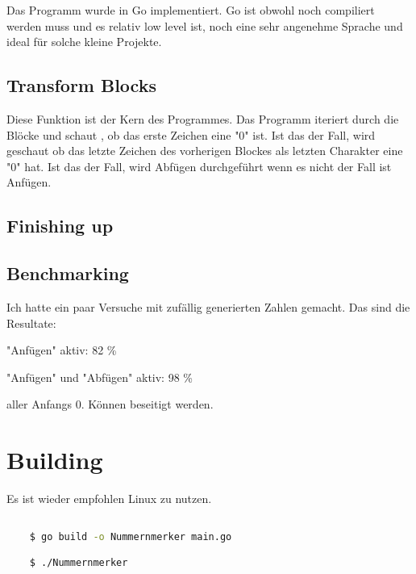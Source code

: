 \documentclass{article}
\begin{document}
Das Programm wurde in Go implementiert. Go ist obwohl noch compiliert werden muss und es relativ low level ist, noch eine sehr angenehme Sprache und ideal für solche kleine Projekte.

\subsection{Transform Blocks}

Diese Funktion ist der Kern des Programmes. Das Programm iteriert durch die Blöcke und schaut , ob das erste Zeichen eine "0" ist. Ist das der Fall, wird geschaut ob das letzte Zeichen des vorherigen Blockes als letzten Charakter eine "0" hat. Ist das der Fall, wird Abfügen durchgeführt wenn es nicht der Fall ist Anfügen.


\subsection{Finishing up}

\subsection{Benchmarking}

Ich hatte ein paar Versuche mit zufällig generierten Zahlen gemacht. Das sind die Resultate:

"Anfügen" aktiv: 82 \%

"Anfügen" und "Abfügen" aktiv:  98 \%

aller Anfangs 0. Können beseitigt werden.

\section{ Building }

Es ist wieder empfohlen Linux zu nutzen.

\begin{lstlisting}[language=Bash]

    $ go build -o Nummernmerker main.go

    $ ./Nummernmerker

\end{lstlisting}
\end{document}
